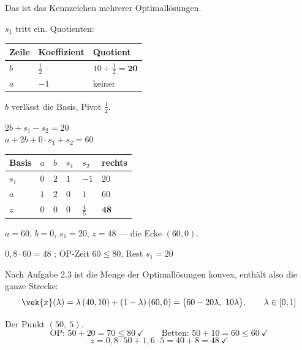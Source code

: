 \begin{aufgabe}
Das ist das Kennzeichen mehrerer Optimallösungen.

$s_1$ tritt ein. Quotienten:
\begin{center}
\renewcommand{\arraystretch}{1.46}
\begin{tabular}{@{}P{2.0cm}P{2.2cm}P{2.6cm}@{}}
\toprule
\textbf{Zeile} & \textbf{Koeffizient} & \textbf{Quotient}\\
\midrule
$b$ & $\tfrac12$ & $10 \div \tfrac12 = \mathbf{20}$\\
$a$ & $-1$ & \textcolor{akzent}{keiner}\\
\bottomrule
\end{tabular}
\end{center}

$b$ verlässt die Basis, Pivot $\frac12$.

 $2b + s_1 - s_2 = 20$\\
 $a + 2b + 0\cdot s_1 + s_2 = 60$

\begin{center}
{\small
\renewcommand{\arraystretch}{1.46}
\begin{tabular}{@{}P{1.6cm}P{1.4cm}P{1.4cm}P{1.4cm}P{1.4cm}P{1.4cm}@{}}
\toprule
\textbf{Basis} & $a$ & $b$ & $s_1$ & $s_2$ & \textbf{rechts}\\
\midrule
$s_1$ & $0$ & $2$ & $1$ & $-1$ & $20$\\
$a$ & $1$ & $2$ & $0$ & $1$ & $60$\\
\midrule
$z$ & $0$ & $0$ & $0$ & $\tfrac45$ & $\mathbf{48}$\\
\bottomrule
\end{tabular}}
\end{center}

$a = 60$, $b = 0$, $s_1 = 20$, $z = 48$ --- die Ecke $(60,0)$.

 $0{,}8\cdot60 = 48$ \checkmark; OP-Zeit $60 \le 80$, Rest $s_1 = 20$ \checkmark

Nach Aufgabe 2.3 ist die Menge der Optimallösungen konvex, enthält also die ganze Strecke:
\[ \vek{x}(\lambda) = \lambda\,(40,10) + (1-\lambda)\,(60,0) = \bigl(60-20\lambda,\ 10\lambda\bigr), \qquad \lambda\in[0,1] \]

 Der Punkt $(50,\ 5)$.
\[ \text{OP: } 50+20 = 70 \le 80 \ \checkmark \qquad \text{Betten: } 50+10 = 60 \le 60 \ \checkmark \]
\[ z = 0{,}8\cdot50 + 1{,}6\cdot5 = 40+8 = 48 \ \checkmark \]


\end{aufgabe}
